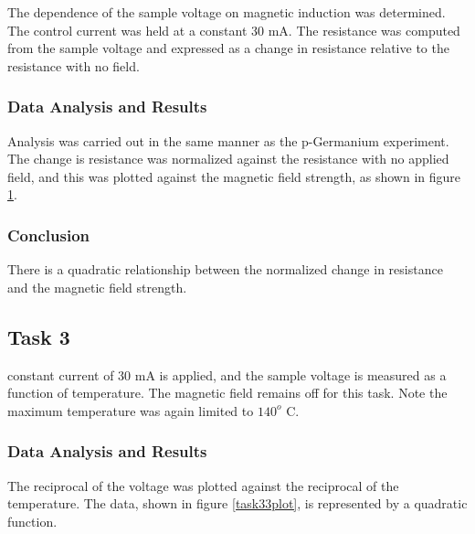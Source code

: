 \documentclass[a4paper]{article}
\begin{document}
\qq The dependence of the sample voltage on magnetic induction was determined. The control current was held at a constant
30 mA. The resistance was computed from the sample voltage and expressed as a change in resistance relative to the resistance with no field.

\subsubsection{Data Analysis and Results}
Analysis was carried out in the same manner as the p-Germanium experiment. The change is resistance was normalized against the resistance with no applied field, and this was plotted against the magnetic field strength, as shown in figure \ref{task32plot}.

\begin{figure}[H]
\centering
\label{task32plot}
\end{figure}


\subsubsection{Conclusion}
There is a quadratic relationship between the normalized change in resistance and the magnetic field strength.

\subsection{Task 3}
 constant current of 30 mA is applied, and the sample voltage is
measured as a function of temperature. The magnetic field
remains off for this task. Note the maximum temperature was again limited to $140^o$ C.

\subsubsection{Data Analysis and Results}
The reciprocal of the voltage was plotted against the 
reciprocal of the temperature. The data, shown in figure \ref{task33plot}, is represented by a quadratic function.
\end{document}
